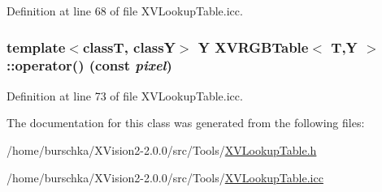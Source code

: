 Definition at line 68 of file XVLookup\-Table.icc.\label{XVRGBTable_a9}
\hypertarget{class_XVRGBTable_a9}{
\subsubsection[operator()]{\setlength{\rightskip}{0pt plus 5cm}template$<$classT, classY$>$ Y XVRGBTable$<$ T,Y $>$::operator() (const {\em pixel})}}




Definition at line 73 of file XVLookup\-Table.icc.

The documentation for this class was generated from the following files:\begin{CompactItemize}
\item 
/home/burschka/XVision2-2.0.0/src/Tools/\hyperlink{XVLookupTable.h-source}{XVLookup\-Table.h}\item 
/home/burschka/XVision2-2.0.0/src/Tools/\hyperlink{XVLookupTable.icc-source}{XVLookup\-Table.icc}\end{CompactItemize}
